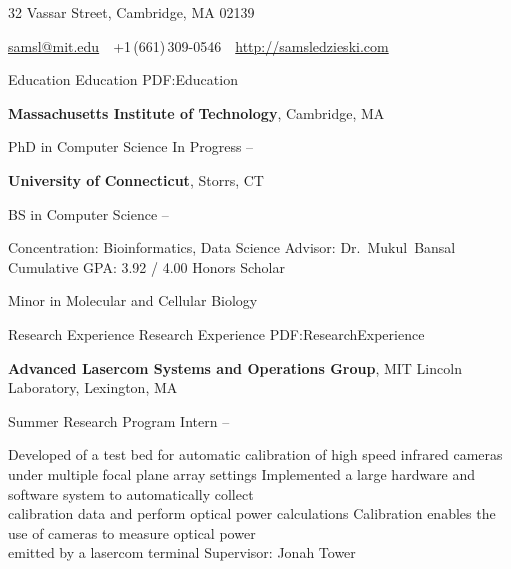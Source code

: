 \documentclass[letterpaper,MMMyyyy,nonstopmode]{simpleresumecv}
\newcommand{\CVAuthor}{Samuel Sledzieski}
\newcommand{\CVWebpage}{http://samsledzieski.com}
\begin{document}
\Title{\CVAuthor}

\begin{SubTitle}
32 Vassar Street, Cambridge, MA 02139
\par
\href{mailto:samsl@mit.edu}
{samsl@mit.edu}
\,\SubBulletSymbol\,
+1\,(661)\,309-0546
\,\SubBulletSymbol\,
\href{\CVWebpage}
{\url{\CVWebpage}}
\end{SubTitle}

\begin{Body}


\Section
{Education}
{Education}
{PDF:Education}

\Entry
\textbf{Massachusetts Institute of Technology},
Cambridge, MA

\Gap
\BulletItem
PhD in Computer Science
\BulletItem
In Progress
\hfill
{} --
\BigGap

\Entry
\textbf{University of Connecticut},
Storrs, CT

\Gap
\BulletItem
BS in Computer Science
\hfill
{} --
\begin{Detail}
\SubBulletItem
Concentration:
Bioinformatics, Data Science
\SubBulletItem
Advisor:
Dr.~Mukul~Bansal
\SubBulletItem
Cumulative GPA: 3.92 / 4.00
\SubBulletItem
Honors Scholar
\end{Detail}
\BulletItem
Minor in Molecular and Cellular Biology


\Section
{Research Experience}
{Research Experience}
{PDF:ResearchExperience}

\Entry
{\textbf{Advanced Lasercom Systems and Operations Group}},
MIT Lincoln Laboratory, Lexington, MA

\Gap
\BulletItem
Summer Research Program Intern
\hfill
{} --
\begin{Detail}
\SubBulletItem
Developed of a test bed for automatic calibration of high speed infrared cameras \\
under multiple focal plane array settings
\SubBulletItem
Implemented a large hardware and software system to automatically collect \\
calibration data and perform optical power calculations
\SubBulletItem
Calibration enables the use of cameras to measure optical power \\
emitted by a lasercom terminal
\SubBulletItem
Supervisor: Jonah Tower
\end{Detail}
\BigGap


\end{Body}
\end{document}
